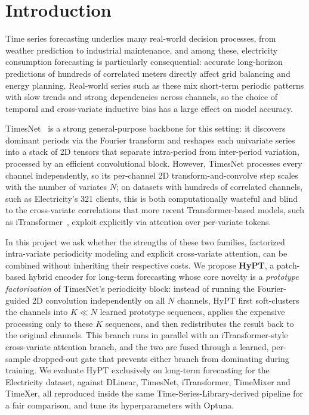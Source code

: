 \documentclass[10pt,journal]{IEEEtran}
\begin{document}
\section{Introduction}
\label{sec:intro}

Time series forecasting underlies many real-world decision processes, from weather prediction to industrial maintenance, and among these, electricity consumption forecasting is particularly consequential: accurate long-horizon predictions of hundreds of correlated meters directly affect grid balancing and energy planning. Real-world series such as these mix short-term periodic patterns with slow trends and strong dependencies across channels, so the choice of temporal and cross-variate inductive bias has a large effect on model accuracy.

TimesNet~\cite{timesnet} is a strong general-purpose backbone for this setting: it discovers dominant periods via the Fourier transform and reshapes each univariate series into a stack of 2D tensors that separate intra-period from inter-period variation, processed by an efficient convolutional block. However, TimesNet processes every channel independently, so its per-channel 2D transform-and-convolve step scales with the number of variates $N$; on datasets with hundreds of correlated channels, such as Electricity's 321 clients, this is both computationally wasteful and blind to the cross-variate correlations that more recent Transformer-based models, such as iTransformer~\cite{itransformer}, exploit explicitly via attention over per-variate tokens.

In this project we ask whether the strengths of these two families, factorized intra-variate periodicity modeling and explicit cross-variate attention, can be combined without inheriting their respective costs. We propose \textbf{HyPT}, a patch-based hybrid encoder for long-term forecasting whose core novelty is a \emph{prototype factorization} of TimesNet's periodicity block: instead of running the Fourier-guided 2D convolution independently on all $N$ channels, HyPT first soft-clusters the channels into $K\!\ll\!N$ learned prototype sequences, applies the expensive processing only to these $K$ sequences, and then redistributes the result back to the original channels. This branch runs in parallel with an iTransformer-style cross-variate attention branch, and the two are fused through a learned, per-sample dropped-out gate that prevents either branch from dominating during training. We evaluate HyPT exclusively on long-term forecasting for the Electricity dataset, against DLinear, TimesNet, iTransformer, TimeMixer and TimeXer, all reproduced inside the same Time-Series-Library-derived pipeline for a fair comparison, and tune its hyperparameters with Optuna.
\end{document}
